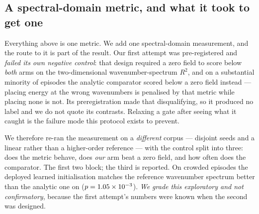 \documentclass[review]{elsarticle}
\begin{document}
\subsection{A spectral-domain metric, and what it took to get one}
\label{sec:res_spectral}
Everything above is one metric. We add one spectral-domain measurement, and the
route to it is part of the result. Our first attempt was pre-registered and
\emph{failed its own negative control}: that design required a zero field to score
below \emph{both} arms on the two-dimensional wavenumber-spectrum $R^2$, and on a
substantial minority of episodes the analytic comparator scored below a zero field
instead --- placing energy at the wrong wavenumbers is penalised by that metric while
placing none is not. Its preregistration made that disqualifying, so it produced no
label and we do not quote its contrasts. Relaxing a gate after seeing what it caught
is the failure mode this protocol exists to prevent.

We therefore re-ran the measurement on a \emph{different} corpus --- disjoint seeds
and a linear rather than a higher-order reference --- with the control split into
three: does the metric behave, does \emph{our} arm beat a zero field, and how often
does the comparator. The first two block; the third is reported. On \SpecN{} crowded
episodes the deployed learned initialisation matches the reference wavenumber
spectrum better than the analytic one on \SpecBetter{}
($p = 1.05\times 10^{-3}{}$). \emph{We grade this exploratory and not confirmatory}, because the
first attempt's numbers were known when the second was designed.
\end{document}
